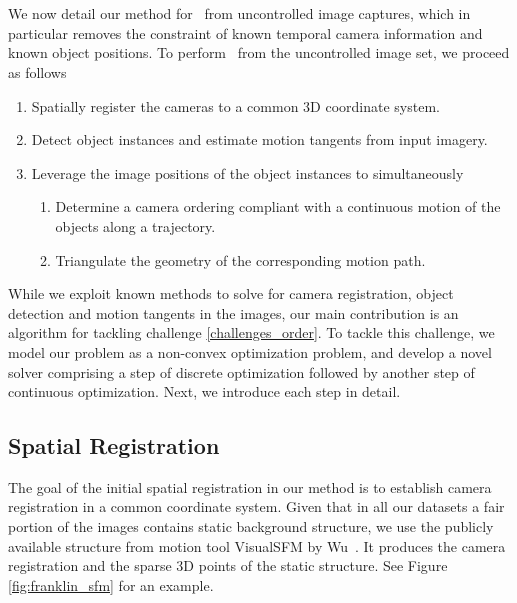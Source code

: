 \section{\JOST}

We now detail our method for \jost~from uncontrolled image captures, which in particular removes the constraint of known temporal camera information and known object positions. To perform \jost~from the uncontrolled image set, we proceed as follows
\begin{enumerate}
\item \label{challenges_sfm} Spatially register the cameras to a common 3D coordinate system.
\item \label{challenges_tang} Detect object instances and estimate motion tangents from input imagery.
\item \label{challenges_order} Leverage the image positions of the object instances to simultaneously
\begin{enumerate}
\item Determine a camera ordering compliant with a continuous motion of the objects along a trajectory.
\item Triangulate the geometry of the corresponding motion path.
\end{enumerate}

\end{enumerate}
While we exploit known methods to solve for camera registration, object detection and motion tangents in the images, our main contribution is an algorithm for tackling challenge  \ref{challenges_order}. To tackle this challenge, we model our problem as a non-convex optimization problem, and develop a novel solver comprising a step of discrete optimization followed by another step of continuous optimization. 
Next, we introduce each step in detail.

\subsection{Spatial Registration}
The goal of the initial spatial registration in our method is to establish camera registration in a common coordinate system.
Given that in all our datasets a fair portion of the images contains static background structure, we use the publicly available structure from motion tool VisualSFM by Wu~\cite{WuVSFM}. It produces the camera registration and the sparse 3D points of the static structure. See Figure \ref{fig:franklin_sfm} for an example.

